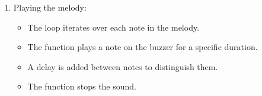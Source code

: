 \documentclass[a4paper,11pt,english]{sphinxmanual}
\begin{document}
\begin{enumerate}
\begin{sphinxVerbatim}[commandchars=\\\{\}]
\PYG{p}{[}\PYG{p}{]}
\PYG{p}{[}\PYG{p}{]}
\end{sphinxVerbatim}

\item {} 
\sphinxAtStartPar
Playing the melody:
\begin{itemize}
\item {} 
\sphinxAtStartPar
The  loop iterates over each note in the melody.

\item {} 
\sphinxAtStartPar
The  function plays a note on the buzzer for a specific duration.

\item {} 
\sphinxAtStartPar
A delay is added between notes to distinguish them.

\item {} 
\sphinxAtStartPar
The  function stops the sound.

\end{itemize}


\end{enumerate}
\end{document}
